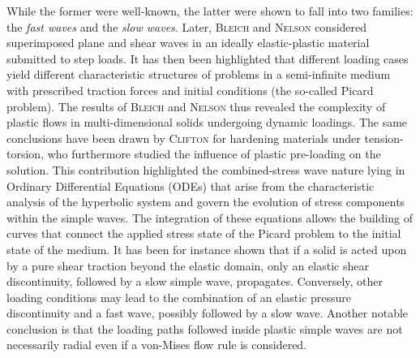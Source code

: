 While the former were well-known, the latter were shown to fall into two families: the \textit{fast waves} and the \textit{slow waves}.
%
Later, \textsc{Bleich} and \textsc{Nelson} \cite{Bleich} considered superimposed plane and shear waves in an ideally elastic-plastic material submitted to step loads.
It has then been highlighted that different loading cases yield different characteristic structures of problems in a semi-infinite medium with prescribed traction forces and initial conditions (the so-called Picard problem).
The results of \textsc{Bleich} and \textsc{Nelson} thus revealed the complexity of plastic flows in multi-dimensional solids undergoing dynamic loadings.
The same conclusions have been drawn by \textsc{Clifton} \cite{Clifton} for hardening materials under tension-torsion, who furthermore studied the influence of plastic pre-loading on the solution.
This contribution highlighted the combined-stress wave nature lying in Ordinary Differential Equations (ODEs) that arise from the characteristic analysis of the hyperbolic system and govern the evolution of stress components within the simple waves.
The integration of these equations allows the building of curves that connect the applied stress state of the Picard problem to the initial state of the medium.
It has been for instance shown that if a solid is acted upon by a pure shear traction beyond the elastic domain, only an elastic shear discontinuity, followed by a slow simple wave, propagates.
Conversely, other loading conditions may lead to the combination of an elastic pressure discontinuity and a fast wave, possibly followed by a slow wave.
Another notable conclusion is that the loading paths followed inside plastic simple waves are not necessarily radial even if a von-Mises flow rule is considered.

